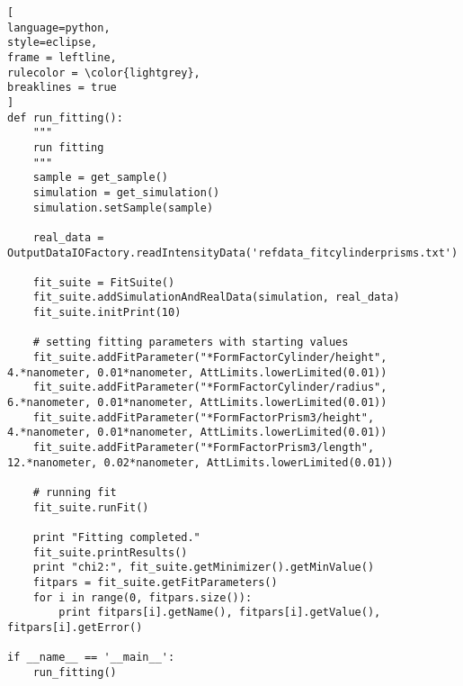 \begin{lstlisting}[
language=python, 
style=eclipse, 
frame = leftline, 
rulecolor = \color{lightgrey},
breaklines = true
]
def run_fitting():
    """
    run fitting
    """
    sample = get_sample()
    simulation = get_simulation()
    simulation.setSample(sample)

    real_data = OutputDataIOFactory.readIntensityData('refdata_fitcylinderprisms.txt')
    
    fit_suite = FitSuite()
    fit_suite.addSimulationAndRealData(simulation, real_data)
    fit_suite.initPrint(10)

    # setting fitting parameters with starting values
    fit_suite.addFitParameter("*FormFactorCylinder/height", 4.*nanometer, 0.01*nanometer, AttLimits.lowerLimited(0.01))
    fit_suite.addFitParameter("*FormFactorCylinder/radius", 6.*nanometer, 0.01*nanometer, AttLimits.lowerLimited(0.01))
    fit_suite.addFitParameter("*FormFactorPrism3/height", 4.*nanometer, 0.01*nanometer, AttLimits.lowerLimited(0.01))
    fit_suite.addFitParameter("*FormFactorPrism3/length", 12.*nanometer, 0.02*nanometer, AttLimits.lowerLimited(0.01))

    # running fit
    fit_suite.runFit()
    
    print "Fitting completed."
    fit_suite.printResults()
    print "chi2:", fit_suite.getMinimizer().getMinValue()
    fitpars = fit_suite.getFitParameters()
    for i in range(0, fitpars.size()):
        print fitpars[i].getName(), fitpars[i].getValue(), fitpars[i].getError()

if __name__ == '__main__':
    run_fitting()
\end{lstlisting}

